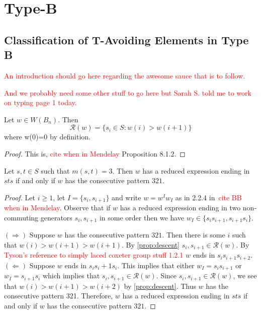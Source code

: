 \chapter{Type-B}

\section{Classification of T-Avoiding Elements in Type B}\label{sec:TAB}

\textcolor{red}{An introduction should go here regarding the awesome sauce that is to follow.}

\textcolor{red}{And we probably need some other stuff to go here but Sarah S. told me to work on typing page 1 today.}

\begin{proposition}\label{prop:descent}
Let $w \in W(B_n)$. Then 
\[ \mathcal{R}(w)=\{s_i \in S: w(i) > w(i+1)\} \]
where w(0)=0 by definition.
\begin{proof}
	This is, \textcolor{red}{cite when in Mendelay} Proposition 8.1.2.
\end{proof}
\end{proposition}


\begin{lemma}\label{lem:sts}
Let $s,t \in S$ such that $m(s,t)=3.$ Then $w$ has a reduced expression ending in $sts$ if and only if $w$ has the consecutive pattern $321$.
\begin{proof}
	Let $i \geq 1$, let $I=\{s_i,s_{i+1}\}$ and write $w=w^Iw_I$ as in 2.2.4 in~\textcolor{red}{cite BB when in Mendelay}. Observe that if $w$ has a reduced expression ending in two non-commuting generators $s_i, s_{i+1}$ in some order then we have $w_I \in \{s_is_{i+1}, s_{i+1}s_i\}$.
	
	$(\Rightarrow)$ Suppose $w$ has the consecutive pattern $321$. Then there is some $i$ such that $w(i) > w(i+1) > w(i+1)$. By \ref{prop:descent} $s_i,s_{i+1} \in \mathcal{R}(w)$. By \textcolor{red}{Tyson's reference to simply laced coxeter group stuff 1.2.1} $w$ ends in $s_is_{i+1}s_{i+2}$.
	$(\Leftarrow)$ Suppose $w$ ends in $s_is_i+1s_i$. This implies that either $w_I=s_is_{i+1}$ or $w_I=s_{i+1}s_i$ which implies that $s_i,s_{i+1} \in \mathcal{R}(w)$. Since $s_i,s_{i+1} \in \mathcal{R}(w)$, we see that $w(i)>w(i+1)>w(i+2)$ by \ref{prop:descent}. Thus $w$ has the consecutive pattern 321.
	Therefore, $w$ has a reduced expression ending in $sts$ if and only if $w$ has the consecutive pattern $321$. 
\end{proof}	
\end{lemma}

